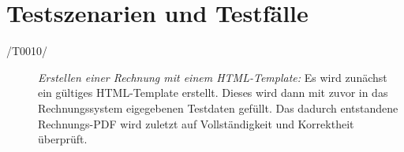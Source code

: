 \section{Testszenarien und Testf\"alle}



\begin{description}
  \item[/T0010/]
    \textit{Erstellen einer Rechnung mit einem HTML-Template:}
   Es wird zun\"achst ein g\"ultiges HTML-Template erstellt. Dieses wird dann mit zuvor in das Rechnungssystem eigegebenen Testdaten gef\"ullt. Das dadurch entstandene Rechnungs-PDF wird zuletzt auf Vollst\"andigkeit und Korrektheit \"uberpr\"uft.

\end{description}


